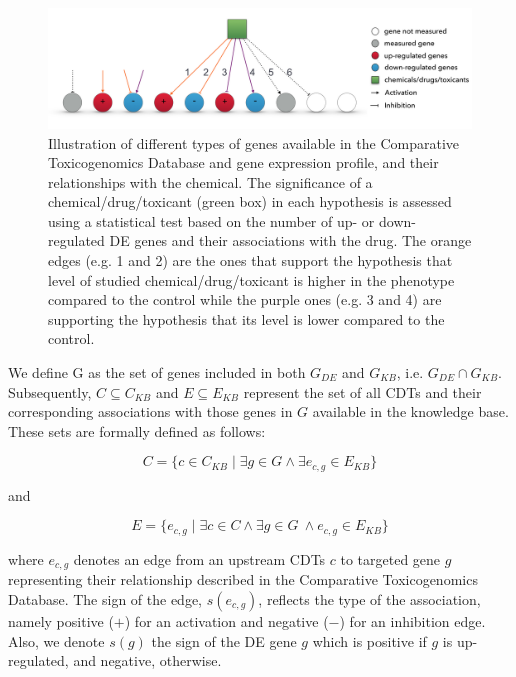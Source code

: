 \begin{figure}
\centering
  \includegraphics[width=1\linewidth]{Figures/SecondEvidence.pdf}
  \caption{Illustration of different types of genes available in the Comparative Toxicogenomics Database and gene expression profile, and their relationships with the chemical. The significance of a chemical/drug/toxicant (green box) in each hypothesis is assessed using a statistical test based on the number of up- or down-regulated DE genes and their associations with the drug. The orange edges (e.g. 1 and 2) are the ones that support the hypothesis that level of studied chemical/drug/toxicant is higher in the phenotype compared to the control while the purple ones (e.g. 3 and 4) are supporting the hypothesis that its level is lower compared to the control.}
  \label{fig:SignificantDrug}
\end{figure}

We define G as  the set of genes included in both $G_{DE}$ and $G_{KB}$, i.e.  $G_{DE} \cap G_{KB}$. Subsequently, $C \subseteq C_{KB}$  and $E \subseteq E_{KB}$ represent the set of all CDTs and their corresponding associations with those genes in $G$ available in the knowledge base. These sets are formally defined as follows:

\begin{equation}C = \{c \in C_{KB} \mid \exists g \in G \land \exists e_{c,g} \in E_{KB} \}\end{equation}

and 

\begin{equation} E = \{ e_{c,g} \mid \exists c \in C \land  \exists g \in G \ \land  e_{c,g} \in E_{KB} \} \end{equation}


where $e_{c,g}$ denotes an edge from an upstream CDTs $c$ to targeted gene $g$ representing their relationship described in the Comparative Toxicogenomics Database. The sign of the edge, $s(e_{c,g})$, reflects the type of the association, namely positive ($+$) for an activation and negative ($-$) for an inhibition edge. Also, we denote $s(g)$ the sign of the DE gene $g$ which is positive if $g$ is up-regulated, and negative, otherwise. 

